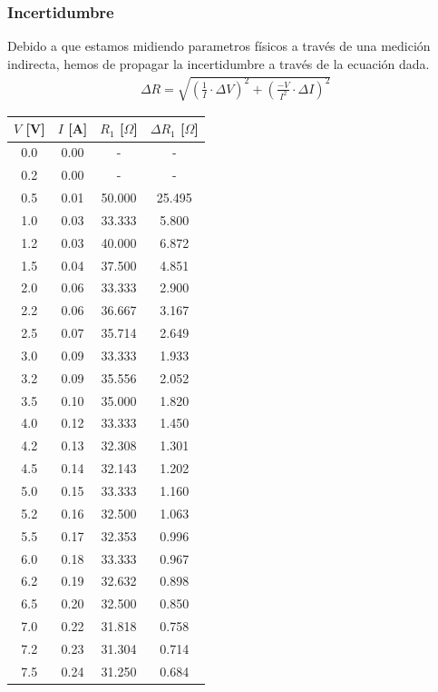 \documentclass[12pt]{article}
\begin{document}
\subsubsection{Incertidumbre}
Debido a que estamos midiendo parametros físicos a través de una medición indirecta, hemos de propagar la incertidumbre a través de la ecuación dada.
\begin{align}
    \Delta R = \sqrt{(\frac{1}{I}\cdot \Delta V)^2+(\frac{-V}{I^2}\cdot \Delta I)^2}
\end{align}
\begin{table}[htbp]
    \centering
    \begin{tabular}{|c|c|c|c|}
        \hline
        $V$ [V] & $I$ [A] & $R_1$ [$\Omega$] & $\Delta R_1$ [$\Omega$] \\
        \hline\hline
         0.0& 0.00& -& - \\
         0.2& 0.00& -& -\\
         0.5& 0.01& 50.000& 25.495\\
         1.0& 0.03& 33.333& 5.800\\
         1.2& 0.03& 40.000& 6.872\\
         1.5& 0.04& 37.500& 4.851\\
         2.0& 0.06& 33.333& 2.900\\
         2.2& 0.06& 36.667& 3.167\\
         2.5& 0.07& 35.714& 2.649\\
         3.0& 0.09& 33.333& 1.933\\
         3.2& 0.09& 35.556& 2.052\\
         3.5& 0.10& 35.000& 1.820\\
         4.0& 0.12& 33.333& 1.450\\
         4.2& 0.13& 32.308& 1.301\\
         4.5& 0.14& 32.143& 1.202\\
         5.0& 0.15& 33.333& 1.160\\
         5.2& 0.16& 32.500& 1.063\\
         5.5& 0.17& 32.353& 0.996\\
         6.0& 0.18& 33.333& 0.967\\
         6.2& 0.19& 32.632& 0.898\\
         6.5& 0.20& 32.500& 0.850\\
         7.0& 0.22& 31.818& 0.758\\
         7.2& 0.23& 31.304& 0.714\\
         7.5& 0.24& 31.250& 0.684\\

\end{tabular}
\end{table}
\end{document}
